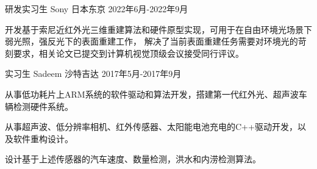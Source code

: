 

\begin{cventries}


  \cventry
    {研发实习生} %
    {Sony} %
    {日本东京} %
    {2022年6月-2022年9月} %
    {
      \begin{cvitems} %
        \item {开发基于索尼近红外光三维重建算法和硬件原型实现，可用于在自由环境光场景下弱光照，强反光下的表面重建工作， 解决了当前表面重建任务需要对环境光的苛刻要求，相关论文已提交到计算机视觉顶级会议接受同行评议。}
      \end{cvitems}
    }

  \cventry
    {实习生} %
    {Sadeem} %
    {沙特吉达} %
    {2017年5月-2017年9月} %
    {
      \begin{cvitems} %
        \item {从事低功耗片上ARM系统的软件驱动和算法开发，搭建第一代红外光、超声波车辆检测硬件系统。}
        \item {从事超声波、低分辨率相机、红外传感器、太阳能电池充电的C++驱动开发，以及软件重构设计。}
        \item {设计基于上述传感器的汽车速度、数量检测，洪水和内涝检测算法。}
      \end{cvitems}
    }


\end{cventries}
